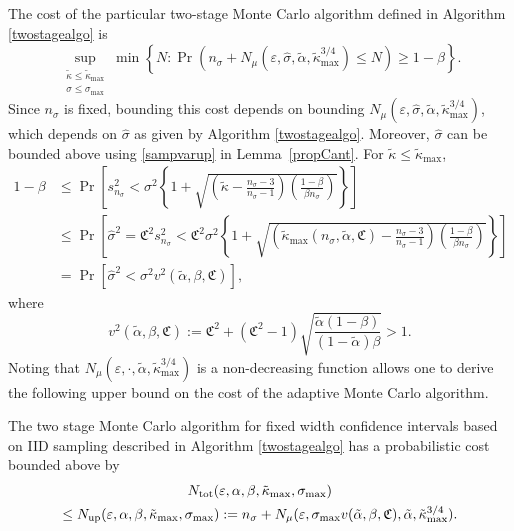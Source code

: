 \documentclass[graybox]{svmult}
\newcommand{\fudge}{\mathfrak{C}}
\newcommand{\Prob}{\Pr}
\newcommand{\hsigma}{\hat{\sigma}}
\newcommand{\talpha}{\tilde{\alpha}}
\newcommand{\tkappa}{\tilde{\kappa}}
\begin{document}
The cost of the particular two-stage Monte Carlo algorithm defined in Algorithm \ref{twostagealgo} is
\begin{equation*}
\sup_{\substack{\tkappa \le \tkappa_{\max} \\ \sigma \le \sigma_{\max}}} \min\left\{N : \Prob(n_{\sigma} + N_{\mu}(\varepsilon,\hsigma,\tilde\alpha,\tilde\kappa_{\max}^{3/4}) \le N) \ge 1-\beta  \right \}.
\end{equation*}
Since $n_{\sigma}$ is fixed, bounding this cost depends on bounding $N_{\mu}(\varepsilon,\hsigma,\tilde\alpha,\tilde\kappa_{\max}^{3/4})$, which depends on $\hsigma$ as given by Algorithm \ref{twostagealgo}.  Moreover, $\hsigma$ can be bounded above using \eqref{sampvarup} in Lemma~\ref{propCant}.  For $\tkappa \le \tkappa_{\max}$, 
\begin{align*}
1-\beta & \le \Prob\left[s^2_{n_{\sigma}} < \sigma^2 \left\{1 + \sqrt{\left ( \tkappa  - \frac{n_{\sigma}-3}{n_{\sigma}-1}\right)\left(\frac{1-\beta}{\beta n_{\sigma}}\right)}\right\} \right] \\
& \le \Prob\left[\hsigma^2 = \fudge^2 s^2_{n_{\sigma}} < \fudge^2\sigma^2 \left\{1 + \sqrt{\left ( \tkappa_{\max}(n_{\sigma},\talpha,\fudge)  - \frac{n_{\sigma}-3}{n_{\sigma}-1}\right)\left(\frac{1-\beta}{\beta n_{\sigma}}\right)}\right\} \right] \\
& = \Prob\left[\hsigma^2 < \sigma^2 v^2(\talpha,\beta,\fudge) \right],
\end{align*}
where
\[
v^2(\talpha,\beta,\fudge) :=  \fudge^2 + \left(\fudge^2 - 1\right)\sqrt{\frac{ \talpha(1-\beta)}{(1-\talpha)\beta} } > 1.
\]
Noting that $N_{\mu}(\varepsilon,\cdot,\tilde\alpha,\tilde\kappa_{\max}^{3/4})$ is a non-decreasing function allows one to derive the following upper bound on the cost of the adaptive Monte Carlo algorithm.

\begin{theorem} \label{costtheorem} The two stage Monte Carlo algorithm for fixed width confidence intervals based on IID sampling described in Algorithm \ref{twostagealgo} has a probabilistic cost bounded above by 
\begin{multline*}
N_{\rm{tot}}(\varepsilon,\alpha, \beta, \tkappa_{\max}, \sigma_{\max}) \\
\le
N_{\rm{up}}(\varepsilon,\alpha, \beta, \tkappa_{\max}, \sigma_{\max}) :=  n_{\sigma} + N_{\mu}(\varepsilon,\sigma_{\max}v(\talpha,\beta,\fudge),\talpha,\tkappa_{\max}^{3/4}) .
\end{multline*} 
\end{theorem}
\end{document}
